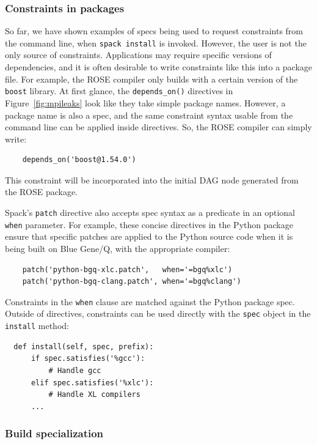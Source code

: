 \subsubsection{Constraints in packages}

So far, we have shown examples of specs being used to request constraints from the
command line, when {\tt spack install} is invoked.  However, the user is not the only
source of constraints.  Applications may require specific versions of dependencies,
and it is often desirable to write constraints like this into a package file.  For
example, the ROSE compiler only builds with a certain version of the {\tt boost} library.
At first glance, the {\tt depends\_on()} directives in Figure~\ref{fig:mpileaks} look
like they take simple package names.  However, a package name is also a spec, and
the same constraint syntax usable from the command line can be applied inside directives.
So, the ROSE compiler can simply write:
%
\begin{verbatim}
    depends_on('boost@1.54.0')
\end{verbatim}
%
This constraint will be incorporated into the initial DAG node generated from
the ROSE package.

Spack's {\tt patch} directive also accepts spec syntax as a predicate in an
optional {\tt when} parameter.  For example, these concise directives in the 
Python package ensure that specific patches are applied to the Python source
code when it is being built on Blue Gene/Q, with the appropriate compiler:
%
\begin{verbatim}
    patch('python-bgq-xlc.patch',   when='=bgq%xlc')
    patch('python-bgq-clang.patch', when='=bgq%clang')
\end{verbatim}
%
Constraints in the {\tt when} clause are matched against the Python package spec.
Outside of directives, constraints can be used directly
with the {\tt spec} object in the {\tt install} method:
%
\begin{verbatim}
  def install(self, spec, prefix):
      if spec.satisfies('%gcc'):
          # Handle gcc
      elif spec.satisfies('%xlc'):
          # Handle XL compilers
      ...
\end{verbatim}
%

\subsubsection{Build specialization}

